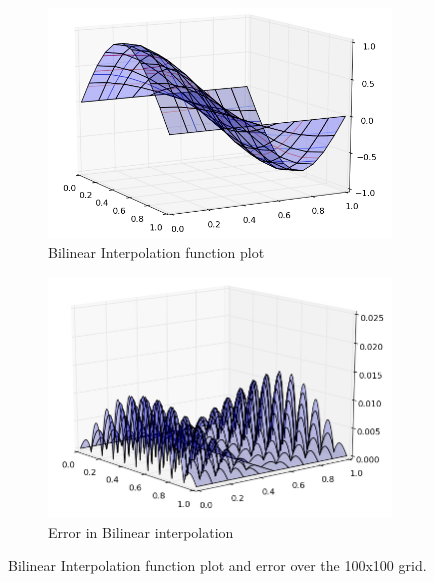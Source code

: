 \documentclass[11pt]{article}
\begin{document}
\begin{figure}[h]
        \centering
        \begin{subfigure}{.5\textwidth}
  \centering
        \includegraphics[width=1\linewidth]{q8/lin_func_10.png}
                \caption{Bilinear Interpolation function plot}
                \label{fig:q8_lin_func_10}
                \end{subfigure}%
\begin{subfigure}{.5\textwidth}
  \centering
        \includegraphics[width=1\linewidth]{q8/lin_err_10.png}
                \caption{Error in Bilinear interpolation}
                \label{fig:q8_lin_err_10}
	\end{subfigure}
            
\caption{Bilinear Interpolation function plot and error over the 100x100 grid.}
\label{fig:q8_lin_10}        
\end{figure}  
\end{document}
